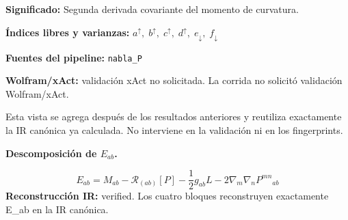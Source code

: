 \documentclass[11pt]{article}
\begin{document}
\par\vspace{1.2\baselineskip}\noindent
\begin{minipage}{\linewidth}
\textbf{Significado:} Segunda derivada covariante del momento de curvatura.\par
\textbf{Índices libres y varianzas:} $ a^{\uparrow},\;b^{\uparrow},\;c^{\uparrow},\;d^{\uparrow},\;e_{\downarrow},\;f_{\downarrow} $\par
\textbf{Fuentes del pipeline:} \texttt{nabla\_P}\par
\textbf{Wolfram/xAct:} validación xAct no solicitada. La corrida no solicitó validación Wolfram/xAct.\par
\end{minipage}
\par\bigskip{}\par
Esta vista se agrega después de los resultados anteriores y reutiliza exactamente la IR canónica ya calculada. No interviene en la validación ni en los fingerprints.\par
{}
\par\medskip\noindent\textbf{Descomposición de $ E_{ab} $.}\par
\begin{dmath*}[breakdepth={5}]
E_{ab}=M_{ab}-\mathcal{R}_{(ab)}[P]-\frac{1}{2}g_{ab}L-2\nabla_m\nabla_nP^{mn}{}_{ab}
\end{dmath*}
\textbf{Reconstrucción IR:} verified. Los cuatro bloques reconstruyen exactamente E\_ab en la IR canónica.\par
\end{document}
